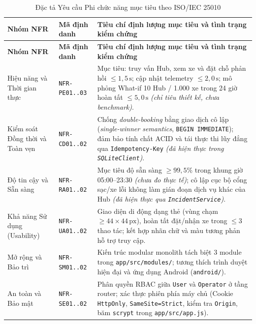 \begin{longtable}{>{\raggedright\arraybackslash}p{2.8cm} >{\raggedright\arraybackslash}p{2.3cm} >{\raggedright\arraybackslash}p{8.5cm}}
\caption{Đặc tả Yêu cầu Phi chức năng mục tiêu theo ISO/IEC 25010} \label{tab:nfrs} \\
\toprule
\textbf{Nhóm NFR} & \textbf{Mã định danh} & \textbf{Tiêu chí định lượng mục tiêu và tình trạng kiểm chứng} \\
\midrule
\endfirsthead
\toprule
\textbf{Nhóm NFR} & \textbf{Mã định danh} & \textbf{Tiêu chí định lượng mục tiêu và tình trạng kiểm chứng} \\
\midrule
\endhead
\bottomrule
\endfoot
Hiệu năng và Thời gian thực & \texttt{NFR-PE01..03} & Mục tiêu: truy vấn Hub, xem xe và đặt chỗ phản hồi $\le 1{,}5\,\text{s}$; cập nhật telemetry $\le 2{,}0\,\text{s}$; mô phỏng What-if 10 Hub / 1.000 xe trong 24 giờ hoàn tất $\le 5{,}0\,\text{s}$ \textit{(chỉ tiêu thiết kế, chưa benchmark)}. \\
\addlinespace[3pt]
Kiểm soát Đồng thời và Toàn vẹn & \texttt{NFR-CD01..02} & Chống \textit{double-booking} bằng giao dịch cô lập (\textit{single-winner semantics}, \texttt{BEGIN IMMEDIATE}); đảm bảo tính chất ACID và tái thực thi lũy đẳng qua \texttt{Idempotency-Key} \textit{(đã hiện thực trong \texttt{SQLiteClient})}. \\
\addlinespace[3pt]
Độ tin cậy và Sẵn sàng & \texttt{NFR-RA01..02} & Mục tiêu độ sẵn sàng $\ge 99{,}5\%$ trong khung giờ 05:00--23:30 \textit{(chưa đo thực tế)}; cô lập cục bộ cổng sạc/xe lỗi không làm gián đoạn dịch vụ khác của Hub \textit{(đã hiện thực qua \texttt{IncidentService})}. \\
\addlinespace[3pt]
Khả năng Sử dụng (Usability) & \texttt{NFR-UA01..02} & Giao diện di động dạng thẻ (vùng chạm $\ge 44\times 44\,\text{px}$), hoàn tất đặt/nhận xe trong $\le 3$ thao tác; kết hợp nhãn chữ và màu tương phản hỗ trợ truy cập. \\
\addlinespace[3pt]
Mở rộng và Bảo trì & \texttt{NFR-SM01..02} & Kiến trúc modular monolith tách biệt 3 module trong \texttt{app/src/modules/}; tương thích trình duyệt hiện đại và ứng dụng Android (\texttt{android/}). \\
\addlinespace[3pt]
An toàn và Bảo mật & \texttt{NFR-SE01..02} & Phân quyền RBAC giữa \texttt{User} và \texttt{Operator} ở tầng router; xác thực phiên phía máy chủ (Cookie \texttt{HttpOnly}, \texttt{SameSite=Strict}, kiểm tra \texttt{Origin}, băm \texttt{scrypt} trong \texttt{app/src/app.js}). \\
\end{longtable}

